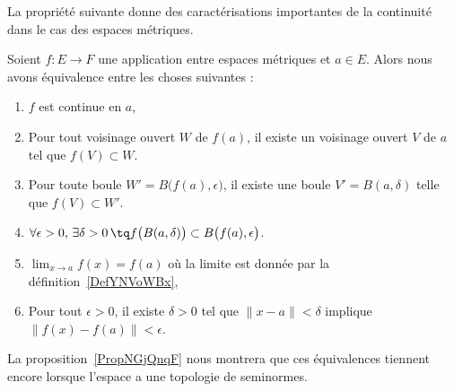 La propriété suivante donne des caractérisations importantes de la continuité dans le cas des espaces métriques.
\begin{proposition} \label{PropQZRNpMn}
	Soient \( f\colon E\to F\) une application entre espaces métriques et \( a\in E\). Alors nous avons équivalence entre les choses suivantes :
	\begin{enumerate}
		\item\label{ItemCBUoRWJi}
		\( f\) est continue en \( a\),
		\item\label{ItemCBUoRWJii}
		Pour tout voisinage ouvert \( W\) de \( f(a)\), il existe un voisinage ouvert \( V\) de \( a\) tel que \( f(V)\subset W\).
		\item\label{ItemCBUoRWJiii}
		Pour toute boule \( W'=B\big( f(a),\epsilon \big)\), il existe une boule \( V'=B(a,\delta)\) telle que \( f(V)\subset W'\).
		\item\label{ItemCBUoRWJiv}
		\( \forall \epsilon>0,\,\exists \delta>0\,\tq f\big( B(a,\delta) \big)\subset B\big( f(a),\epsilon \big)\).
		\item\label{ItemYNQpikrii}
		\( \lim_{x\to a}f(x)=f(a)\) où la limite est donnée par la définition~\ref{DefYNVoWBx},
		\item\label{ItemYNQpikriii}
		Pour tout \( \epsilon>0\), il existe \( \delta>0\) tel que \( \| x-a \|<\delta\) implique \( \| f(x)-f(a) \|<\epsilon\).
	\end{enumerate}
\end{proposition}
La proposition~\ref{PropNGjQnqF} nous montrera que ces équivalences tiennent encore lorsque l'espace a une topologie de seminormes.

